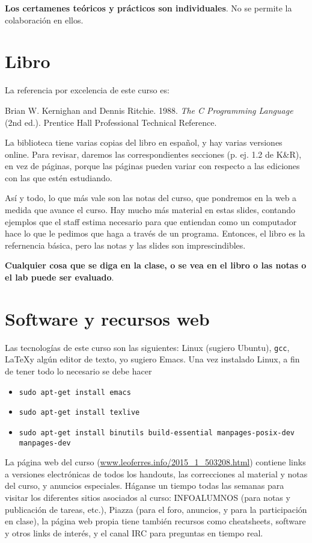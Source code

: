 \documentclass[11pt]{article}
\begin{document}
{\bf Los certamenes te\'oricos y pr\'acticos son individuales}. No se
permite la colaboraci\'on en ellos.

\section{Libro}
\label{sec:book}

La referencia por excelencia de este curso es:

\noindent Brian W. Kernighan and Dennis Ritchie. 1988. {\em The C
  Programming Language} (2nd ed.). Prentice Hall Professional
Technical Reference.

La biblioteca tiene varias copias del libro en espa\~nol, y hay varias
versiones online. Para revisar, daremos las correspondientes secciones
(p. ej. 1.2 de K\&R), en vez de p\'aginas, porque las p\'aginas pueden
variar con respecto a las ediciones con las que est\'en estudiando.

As\'i y todo, lo que m\'as vale son las notas del curso, que pondremos en
la web a medida que avance el curso. Hay mucho m\'as material en estas
slides, contando ejemplos que el staff estima necesario para que
entiendan como un computador hace lo que le pedimos que haga a trav\'es
de un programa. Entonces, el libro es la refernencia b\'asica, pero las
notas y las slides son imprescindibles.

{\bf Cualquier cosa que se diga en la clase, o se vea en el libro o
  las notas o el lab puede ser evaluado}.

\section{Software y recursos web}
\label{sec:website}

Las tecnolog\'ias de este curso son las siguientes: Linux (sugiero
Ubuntu), \verb|gcc|, \LaTeX y alg\'un editor de texto, yo sugiero
Emacs. Una vez instalado Linux, a fin de tener todo lo necesario se
debe hacer

\begin{itemize}
\item {\tt sudo apt-get install emacs}
\item {\tt sudo apt-get install texlive}
\item {\tt sudo apt-get install binutils build-essential manpages-posix-dev manpages-dev}
\end{itemize}

La p\'agina web del curso
(\url{www.leoferres.info/2015_1_503208.html}) contiene links a
versiones electr\'onicas de todos los handouts, las correcciones al
material y notas del curso, y anuncios especiales. H\'aganse un tiempo
todas las semanas para visitar los diferentes sitios asociados al
curso: INFOALUMNOS (para notas y publicaci\'on de tareas, etc.),
Piazza (para el foro, anuncios, y para la participaci\'on en clase),
la p\'agina web propia tiene tambi\'en recursos como cheatsheets,
software y otros links de inter\'es, y el canal IRC para preguntas en
tiempo real.
\end{document}
